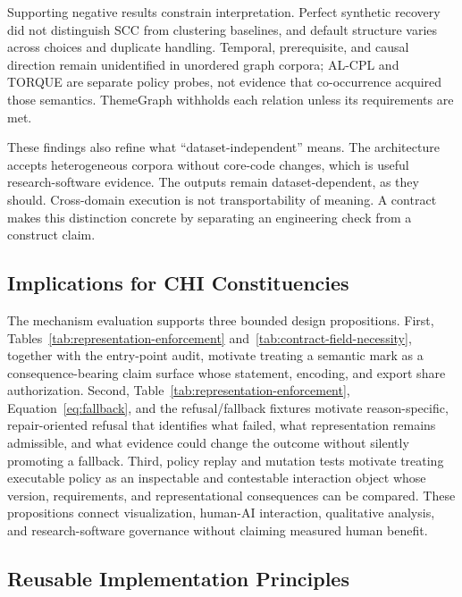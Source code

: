 \documentclass[manuscript,screen,review]{acmart}
\begin{document}
Supporting negative results constrain interpretation. Perfect synthetic recovery did not distinguish SCC from clustering baselines, and default structure varies across choices and duplicate handling. Temporal, prerequisite, and causal direction remain unidentified in unordered graph corpora; AL-CPL and TORQUE are separate policy probes, not evidence that co-occurrence acquired those semantics. ThemeGraph withholds each relation unless its requirements are met.

These findings also refine what ``dataset-independent'' means. The architecture accepts heterogeneous corpora without core-code changes, which is useful research-software evidence. The outputs remain dataset-dependent, as they should. Cross-domain execution is not transportability of meaning. A contract makes this distinction concrete by separating an engineering check from a construct claim.

\subsection{Implications for CHI Constituencies}

The mechanism evaluation supports three bounded design propositions. First, Tables~\ref{tab:representation-enforcement} and~\ref{tab:contract-field-necessity}, together with the entry-point audit, motivate treating a semantic mark as a consequence-bearing claim surface whose statement, encoding, and export share authorization. Second, Table~\ref{tab:representation-enforcement}, Equation~\ref{eq:fallback}, and the refusal/fallback fixtures motivate reason-specific, repair-oriented refusal that identifies what failed, what representation remains admissible, and what evidence could change the outcome without silently promoting a fallback. Third, policy replay and mutation tests motivate treating executable policy as an inspectable and contestable interaction object whose version, requirements, and representational consequences can be compared. These propositions connect visualization, human-AI interaction, qualitative analysis, and research-software governance without claiming measured human benefit.

\subsection{Reusable Implementation Principles}
\end{document}
